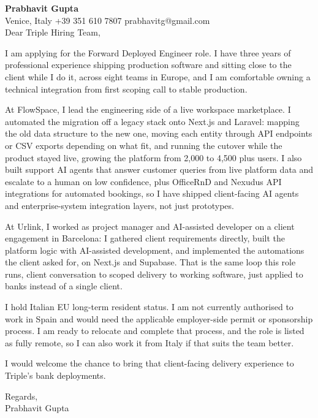 \documentclass[a4paper,10.5pt]{article}
\begin{document}
\textbf{Prabhavit Gupta}\\
Venice, Italy \textbar{} +39 351 610 7807 \textbar{} prabhavitg@gmail.com\\[10pt]
Dear Triple Hiring Team,

I am applying for the Forward Deployed Engineer role. I have three years of professional experience shipping production software and sitting close to the client while I do it, across eight teams in Europe, and I am comfortable owning a technical integration from first scoping call to stable production.

At FlowSpace, I lead the engineering side of a live workspace marketplace. I automated the migration off a legacy stack onto Next.js and Laravel: mapping the old data structure to the new one, moving each entity through API endpoints or CSV exports depending on what fit, and running the cutover while the product stayed live, growing the platform from 2,000 to 4,500 plus users. I also built support AI agents that answer customer queries from live platform data and escalate to a human on low confidence, plus OfficeRnD and Nexudus API integrations for automated bookings, so I have shipped client-facing AI agents and enterprise-system integration layers, not just prototypes.

At Urlink, I worked as project manager and AI-assisted developer on a client engagement in Barcelona: I gathered client requirements directly, built the platform logic with AI-assisted development, and implemented the automations the client asked for, on Next.js and Supabase. That is the same loop this role runs, client conversation to scoped delivery to working software, just applied to banks instead of a single client.

I hold Italian EU long-term resident status. I am not currently authorised to work in Spain and would need the applicable employer-side permit or sponsorship process. I am ready to relocate and complete that process, and the role is listed as fully remote, so I can also work it from Italy if that suits the team better.

I would welcome the chance to bring that client-facing delivery experience to Triple's bank deployments.

Regards,\\
Prabhavit Gupta
\end{document}
